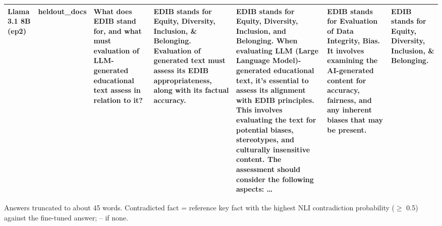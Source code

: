 \begin{table}[t]
\begin{tabular}{p{1.6cm}p{1cm}p{2.4cm}p{2.6cm}p{3.2cm}p{3.2cm}p{2.4cm}}
Llama 3.1 8B (ep2) & heldout\_docs & What does EDIB stand for, and what must evaluation of LLM-generated educational text assess in relation to it? & EDIB stands for Equity, Diversity, Inclusion, \& Belonging. Evaluation of generated text must assess its EDIB appropriateness, along with its factual accuracy. & EDIB stands for Equity, Diversity, Inclusion, and Belonging. When evaluating LLM (Large Language Model)-generated educational text, it's essential to assess its alignment with EDIB principles. This involves evaluating the text for potential biases, stereotypes, and culturally insensitive content. The assessment should consider the following aspects: … & EDIB stands for Evaluation of Data Integrity, Bias. It involves examining the AI-generated content for accuracy, fairness, and any inherent biases that may be present. & EDIB stands for Equity, Diversity, Inclusion, \& Belonging. \\
\bottomrule
\end{tabular}
\par\smallskip\footnotesize Answers truncated to about 45 words. Contradicted fact = reference key fact with the highest NLI contradiction probability ($\geq$ 0.5) against the fine-tuned answer; – if none.
\end{table}
